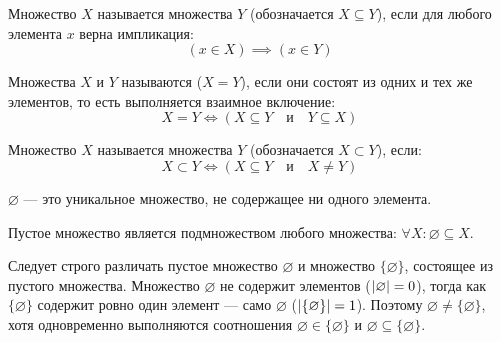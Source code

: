 \begin{definition}
    Множество $X$ называется  множества $Y$ 
    (обозначается $X \subseteq Y$), если для любого элемента $x$ верна 
    импликация:
    \begin{equation} \label{eq:subset_def}
        (x \in X) \implies (x \in Y) \tag{1}
    \end{equation}
\end{definition}

\begin{definition}
    Множества $X$ и $Y$ называются  ($X = Y$), если они 
    состоят из одних и тех же элементов, то есть выполняется взаимное 
    включение:
    \begin{equation} \label{eq:set_eq_def}
        X = Y \iff (X \subseteq Y \quad \text{и} \quad Y \subseteq X) \tag{2}
    \end{equation}
\end{definition}

\begin{definition}
    Множество $X$ называется  
    множества $Y$ (обозначается $X \subset Y$), если:
    \begin{equation} \label{eq:strict_subset_def}
        X \subset Y \iff (X \subseteq Y \quad \text{и} \quad X \neq Y) \tag{3}
    \end{equation}
\end{definition}

\begin{definition}
     $\varnothing$ --- это уникальное множество, 
    не содержащее ни одного элемента.
\end{definition}

\begin{remark}
    Пустое множество является подмножеством любого множества: 
    $\forall X : \varnothing \subseteq X$.
\end{remark}

\begin{remark}
    Следует строго различать пустое множество $\varnothing$ и множество 
    $\{\varnothing\}$, состоящее из пустого множества. Множество 
    $\varnothing$ не содержит элементов ($\left| \varnothing \right| = 0$), тогда как 
    $\{\varnothing\}$ содержит ровно один элемент --- само $\varnothing$ 
    ($\left| \{\varnothing\} \right| = 1$). Поэтому $\varnothing \neq \{\varnothing\}$, 
    хотя одновременно выполняются соотношения $\varnothing \in \{\varnothing\}$ 
    и $\varnothing \subseteq \{\varnothing\}$.
\end{remark}

